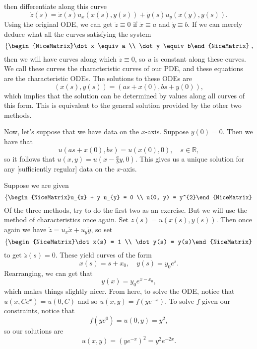 \begin{enumerate}[(1)]
	then differentiate along this curve
	\[ \dot z(s) = \dot x (s) u_{x}(x(s), y(s)) + \dot y(s) u_{y}(x(y), y(s)). \]
	Using the original ODE, we can get \( \dot z \equiv 0 \) if \( \dot x \equiv a \) and \( \dot y \equiv b \).
	If we can merely deduce what all the curves satisfying the system
	\[ \left\{\begin{NiceMatrix}\dot x \equiv a \\ \dot y \equiv b\end{NiceMatrix}\right., \]
	then we will have curves along which \( \dot z \equiv 0 \), so \( u \) is constant along these curves. We call these curves the characteristic curves of our PDE, and these equations are the characteristic ODEs. The solutions to these ODEs are
	\[ (x(s), y(s)) = (as + x(0), bs + y(0)), \]
	which implies that the solution can be determined by values along all curves of this form. This is equivalent to the general solution provided by the other two methods.

	Now, let's suppose that we have data on the \( x \)-axis. Suppose \( y(0) = 0 \). Then we have that
	\[ u(as + x(0), bs) = u(x(0), 0), \quad s \in \mathbb{R}, \] 
	so it follows that \( u(x, y) = u(x - \frac{a}{b} y, 0) \). This gives us a unique solution for any [sufficiently regular] data on the \( x \)-axis.

\end{enumerate}

\begin{example}
	Suppose we are given
	\[ \left\{\begin{NiceMatrix}u_{x} + y u_{y} = 0 \\ u(0, y) = y^{2}\end{NiceMatrix}\right.  \]
	Of the three methods, try to do the first two as an exercise. But we will use the method of characteristics once again. Set \( z(s) = u(x(s), y(s)) \). Then once again we have \( \dot z = u_{x} \dot x + u_{y} \dot y \), so set
	\[ \left\{\begin{NiceMatrix}\dot x(s) = 1 \\ \dot y(s) = y(s)\end{NiceMatrix}\right. \]
	to get \( \dot z(s) = 0 \). These yield curves of the form
	\[ x(s) = s + x_{0}, \quad y(s) = y_{0}e^{s}. \]
	Rearranging, we can get that
	\[ y(x) = y_{0}e^{x-x_{0}}, \]
	which makes things slightly nicer. From here, to solve the ODE, notice that \( u(x, Ce^{x}) = u(0, C) \) and so \( u(x, y) = f(ye^{-x}) \). To solve \( f \) given our constraints, notice that
	\[ f(y e^{0}) = u(0, y) = y^{2}, \]
	so our solutions are
	\[ u(x, y) = \left( ye^{-x} \right)^{2} = y^{2} e^{-2x}. \]
\end{example}

